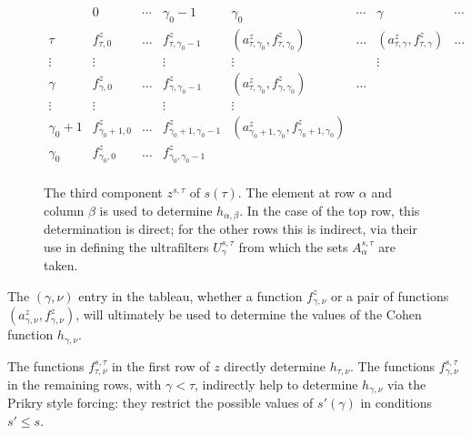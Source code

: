 \documentclass[
twoside,
]{article}
\theoremstyle{definition}
\theoremstyle{remark}
\begin{document}
\begin{figure}[t]
\renewcommand{\arraystretch}{1.25}
\begin{equation*}
    \begin{array}{c|ccccccc} 
      &0&\cdots&\gamma_0-1&\gamma_0&\cdots&\gamma&\cdots \\
      \hline \tau &
      f^{z}_{\tau,0}&\dots&f^{z}_{\tau,\gamma_0-1}&(a^{z}_{\tau,\gamma_0},f^{z}_{\tau,\gamma_0})&\dots&
      (a^{z}_{\tau,\gamma},f^{z}_{\tau,\gamma})&\dots
      \\    
      \vdots&\vdots&&\vdots&\vdots&&\vdots&
      \\
      \gamma& f^{z}_{\gamma,0}& \dots&f^{z}_{\gamma,\gamma_0-1}&
      (a^{z}_{\tau,\gamma_0},f^z_{\gamma,\gamma_0})&\dots&&
      \\
      \vdots&\vdots&&\vdots&\vdots&&&
      \\
      \gamma_0+1& f^{z}_{\gamma_0+1,0}& \dots&f^{z}_{\gamma_0+1,\gamma_0-1}&
      (a^{z}_{\gamma_0+1,\gamma_0},f^{z}_{\gamma_0+1,\gamma_0})& &&
      \\
      \gamma_0& f^{z}_{\gamma_0,0}&\dots&f^{z}_{\gamma_0,\gamma_0-1}&&&& \\
    \end{array}
  \end{equation*}
 \caption{The third component $z^{s,\tau}$ of $s(\tau)$.   The
   element at row $\alpha$ and column $\beta$ is used to determine
   $h_{\alpha,\beta}$.   In the case of the top row, this
   determination is direct; for the other rows this is indirect, via
   their use in  defining the ultrafilters $U^{s,\tau}_{\gamma}$ from which the sets
   $A^{s,\tau}_{\alpha}$ are taken.}
\label{fig:1}
\end{figure}


 The $(\gamma,\nu)$ entry in the tableau, whether a 
function $f^{z}_{\gamma,\nu}$ or a pair of functions
$(a^{z}_{\gamma,\nu}, f^{z}_{\gamma,\nu})$, will ultimately be used to determine
the values of the Cohen function $h_{\gamma,\nu}$.

 The functions $f^{s,\tau}_{\tau,\nu}$ in the first row of $z$ directly
determine $h_{\tau,\nu}$.  The functions $f^{s,\tau}_{\gamma,\nu}$ in the remaining rows, with
$\gamma<\tau$, 
indirectly help to determine $h_{\gamma,\nu}$ via the Prikry style
forcing: they restrict the possible values of $s'(\gamma)$ in
conditions $s'\leq s$. 
\end{document}
